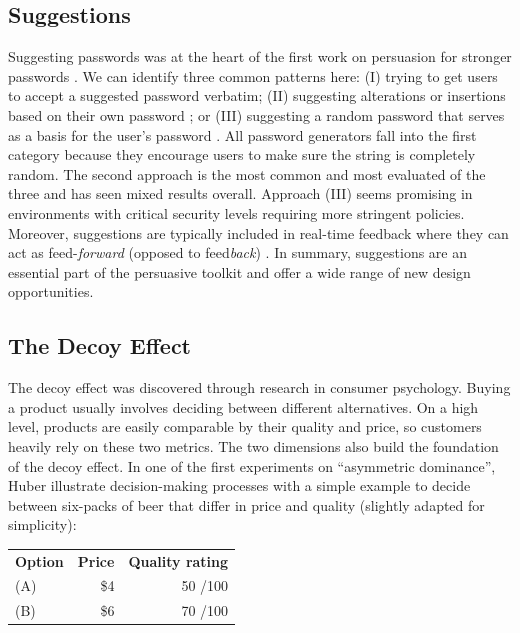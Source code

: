 \subsection{Suggestions}
Suggesting passwords was at the heart of the first work on persuasion for stronger passwords \cite{Forget2008ImprovingPasswordsThroughPersuasion}. We can identify three common patterns here: (I) trying to get users to accept a suggested password verbatim\cite{Vance2013FearAppeals}; (II) suggesting alterations or insertions based on their own password \cite{Forget2008ImprovingPasswordsThroughPersuasion,Segreti2017AdaptivePolicies, Shay2015SpoonfulOfSugar}; or (III) suggesting a random password that serves as a basis for the user's password \cite{Huha2015UserReplaceablePasswords}. All password generators fall into the first category because they encourage users to make sure the string is completely random. The second approach is the most common and most evaluated of the three and has seen mixed results overall. Approach (III) seems promising in environments with critical security levels requiring more stringent policies. Moreover, suggestions are typically included in real-time feedback where they can act as feed-\textit{forward} (opposed to feed\textit{back}) \cite{Ur2017DataDrivenPWMeter}. In summary, suggestions are an essential part of the persuasive toolkit and offer a wide range of new design opportunities.

\subsection{The Decoy Effect}
The decoy effect was discovered through research in consumer psychology. Buying a product usually involves deciding between different alternatives. On a high level, products are easily comparable by their quality and price, so customers heavily rely on these two metrics. The two dimensions also build the foundation of the decoy effect. In one of the first experiments on ``asymmetric dominance'', Huber \etal illustrate decision-making processes with a simple example to decide between six-packs of beer that differ in price and quality \cite{Huber1982AsymetricallyDominated} (slightly adapted for simplicity): 
\begin{table}[!h]
\begin{tabular}{lrr}
	\textbf{Option} & \textbf{Price} & \textbf{Quality rating}\\
	(A) & \$4 & 50 \small{/100}\\
	(B) & \$6 & 70 \small{/100}\\
\end{tabular}
\end{table}

